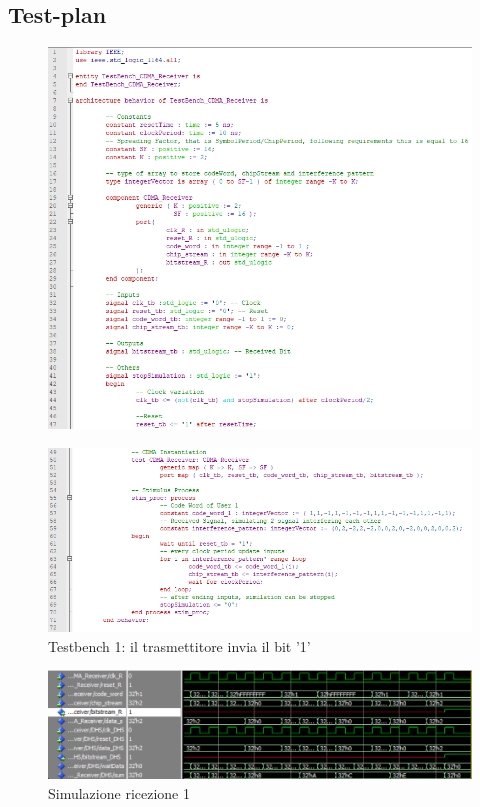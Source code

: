 \documentclass[a4paper,12pt]{article}
\begin{document}
  \subsection{Test-plan}
    \begin{figure}[H]
      \centering
      \includegraphics[width=\textwidth]{img/TB1.png}
      \label{fig:vhdl:tb1}
    \end{figure}
    \begin{figure}[H]
      \centering
      \includegraphics[width=\textwidth]{img/TB1.1.png}
      \caption{Testbench 1: il trasmettitore invia il bit '1'}
      \label{fig:vhdl:tb11}
    \end{figure}

    \begin{figure}[H]
      \centering
      \includegraphics[width=\textwidth]{img/Wave1.png}
      \caption{Simulazione ricezione 1}
      \label{fig:vhdl:wave1}
    \end{figure}
\end{document}
